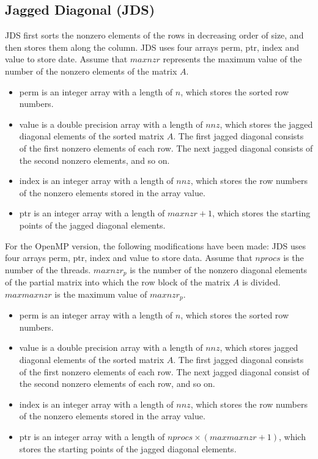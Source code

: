 \documentclass[a4paper]{article}
\begin{document}
\newpage
\subsection{Jagged Diagonal (JDS)}
JDS first sorts the nonzero elements of the rows in decreasing order of
size, and then stores them along the column. JDS uses four arrays
{\ttfamily perm}, {\ttfamily ptr}, {\ttfamily index} and {\ttfamily
value} to store date. Assume that $maxnzr$ represents the maximum value
of the number of the nonzero elements of the matrix $A$.
\begin{itemize}
\item {\ttfamily perm} is an integer array with a length of $n$, which stores the sorted row numbers.
\item {\ttfamily value} is a double precision array with a length of
      $nnz$, which stores the jagged diagonal elements of the sorted matrix $A$. The
      first jagged diagonal consists of the first nonzero elements of
      each row. The next jagged diagonal consists of the second nonzero 
      elements, and so on. 
\item {\ttfamily index} is an integer array with a length of $nnz$,
      which stores the row numbers of the nonzero elements stored in
      the array {\ttfamily value}.
\item {\ttfamily ptr} is an integer array with a length of $maxnzr+1$,
      which stores the starting points of the jagged diagonal elements.
\end{itemize}

For the OpenMP version, the following modifications have been made:
JDS uses four arrays {\ttfamily perm}, {\ttfamily ptr}, {\ttfamily
index} and {\ttfamily value} to store data. Assume that $nprocs$ is the
number of the threads.
$maxnzr_p$ is the number of the nonzero diagonal elements of the partial matrix into which the row block of the matrix $A$ is divided.
$maxmaxnzr$ is the maximum value of $maxnzr_p$.
\begin{itemize}
\item {\ttfamily perm} is an integer array with a length of $n$, which stores the sorted row numbers.
\item {\ttfamily value} is a double precision array with a length of
      $nnz$, which stores jagged diagonal elements of the sorted matrix $A$. The
      first jagged diagonal consists of the first nonzero elements of
      each row. The next jagged diagonal consist of the second
      nonzero elements of each row, and so on. 
\item {\ttfamily index} is an integer array with a length of $nnz$,
      which stores the row numbers of the nonzero elements stored in
      the array {\ttfamily value}.
\item {\ttfamily ptr} is an integer array with a length of $nprocs
      \times (maxmaxnzr + 1)$, which stores the starting points of the
      jagged diagonal elements.
\end{itemize}
\end{document}

